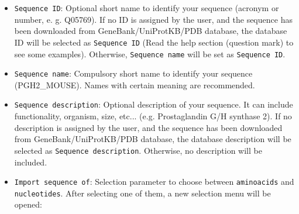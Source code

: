 \documentclass[12pt]{article} %
\newcommand{\ttt}[1]{\texttt{#1}}
\begin{document}
\begin{appendices}
\begin{itemize}
  \begin{itemize}
  \item \ttt{Sequence ID}: Optional short name to identify your sequence (acronym or number, e. g. Q05769). If no ID is assigned by the user, and the sequence has been downloaded from GeneBank/UniProtKB/PDB database, the database ID will be selected as \ttt{Sequence ID} (Read the help section (question mark) to see some examples). Otherwise, \ttt{Sequence name} will be set as \ttt{Sequence ID}.\\
  \item \ttt{Sequence name}: Compulsory short name to identify your sequence (PGH2\_MOUSE). Names with certain meaning are recommended.\\
  \item \ttt{Sequence description}: Optional description of your sequence. It can include functionality, organism, size, etc... (e.g. Prostaglandin G/H synthase 2). If no description is assigned by the user, and the sequence has been downloaded from GeneBank/UniProtKB/PDB database, the database description will be selected as \ttt{Sequence description}. Otherwise, no description will be included.\\
  \item \ttt{Import sequence of}: Selection parameter to choose between \ttt{aminoacids} and \ttt{nucleotides}. After selecting one of them, a new selection menu will be opened:\\
  

\end{itemize}
\end{itemize}
\end{appendices}
\end{document}
